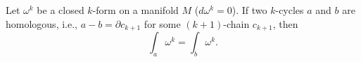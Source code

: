Let $\omega^k$ be a closed $k$-form on a manifold $M$ ($d\omega^k = 0$). If two $k$-cycles $a$ and $b$ are homologous, i.e., $a - b = \partial c_{k+1}$ for some $(k+1)$-chain $c_{k+1}$, then
$$\int_a \omega^k = \int_b \omega^k.$$

